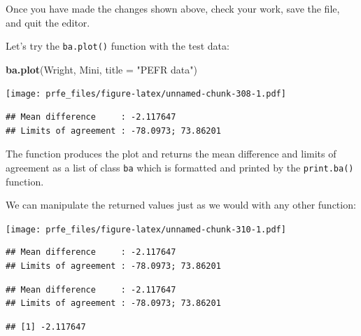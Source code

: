 \documentclass[12pt,]{book}
\newenvironment{Shaded}{\begin{snugshade}}{\end{snugshade}}
\newcommand{\KeywordTok}[1]{\textcolor[rgb]{0.13,0.29,0.53}{\textbf{#1}}}
\newcommand{\DataTypeTok}[1]{\textcolor[rgb]{0.13,0.29,0.53}{#1}}
\newcommand{\DecValTok}[1]{\textcolor[rgb]{0.00,0.00,0.81}{#1}}
\newcommand{\StringTok}[1]{\textcolor[rgb]{0.31,0.60,0.02}{#1}}
\newcommand{\OperatorTok}[1]{\textcolor[rgb]{0.81,0.36,0.00}{\textbf{#1}}}
\newcommand{\NormalTok}[1]{#1}
\theoremstyle{definition}
\theoremstyle{definition}
\theoremstyle{definition}
\theoremstyle{remark}
\begin{document}
Once you have made the changes shown above, check your work, save the
file, and quit the editor.

Let's try the \texttt{ba.plot()} function with the test data:

\begin{Shaded}
\begin{Highlighting}[]
\KeywordTok{ba.plot}\NormalTok{(Wright, Mini, }\DataTypeTok{title =} \StringTok{"PEFR data"}\NormalTok{)}
\end{Highlighting}
\end{Shaded}

\texttt{[image: prfe\_files/figure-latex/unnamed-chunk-308-1.pdf]}

\begin{verbatim}
## Mean difference     : -2.117647
## Limits of agreement : -78.0973; 73.86201
\end{verbatim}

The function produces the plot and returns the mean difference and
limits of agreement as a list of class \texttt{ba} which is formatted
and printed by the \texttt{print.ba()} function.

We can manipulate the returned values just as we would with any other
function:

\begin{Shaded}
\end{Shaded}

\texttt{[image: prfe\_files/figure-latex/unnamed-chunk-310-1.pdf]}

\begin{verbatim}
## Mean difference     : -2.117647
## Limits of agreement : -78.0973; 73.86201
\end{verbatim}

\begin{verbatim}
## Mean difference     : -2.117647
## Limits of agreement : -78.0973; 73.86201
\end{verbatim}

\begin{verbatim}
## [1] -2.117647
\end{verbatim}
\end{document}
